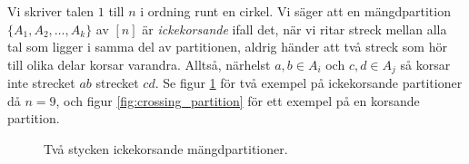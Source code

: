 \documentclass{tufte-handout}
\begin{document}
\begin{xca}
    Vi skriver talen $1$ till $n$ i ordning runt en cirkel. Vi säger att en mängdpartition $\{A_1, A_2, \ldots, A_k\}$ av $[n]$ är \emph{ickekorsande} ifall det, när vi ritar streck mellan alla tal som ligger i samma del av partitionen, aldrig händer att två streck som hör till olika delar korsar varandra. Alltså, närhelst $a, b \in A_i$ och $c, d \in A_j$ så korsar inte strecket $ab$ strecket $cd$. Se figur \ref{fig:two_noncrossing_partitions} för två exempel på ickekorsande partitioner då $n=9$, och figur \ref{fig:crossing_partition} för ett exempel på en korsande partition.
    
    \begin{figure}
        \centering
        \quad
        
        \caption{Två stycken ickekorsande mängdpartitioner.}
        \label{fig:two_noncrossing_partitions}
    \end{figure}


\end{xca}
\end{document}
